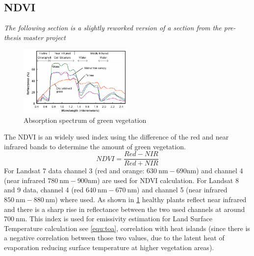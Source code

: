 \subsection{NDVI}
\textit{The following section is a slightly reworked version of a section from the pre-thesis master project~\cite{andrae2023}} 
%
\noindent
\begin{figure}[!htbp]
    \centering
    \includegraphics[width=0.5\textwidth]{img/Reflectance-spectra-of-different-types-of-green-vegetation-compared-to-a-spectral.png}
    \caption{Absorption spectrum of green vegetation\cite[Fig. 2]{Govender2007}\label{fig:absorbtionVeg}}
\end{figure}
The \gls{NDVI} is an widely used index using the difference of the red and near infrared bands to determine the amount of green vegetation. 
\begin{equation}
    NDVI = \frac{Red-NIR}{Red+NIR}
    \label{equ:ndvi}
\end{equation}
For Landsat 7 data channel 3 (red and orange: $630\ \text{nm} - 690 \text{nm}$) and channel 4 (near infrared $780\ \text{nm} - 900 \text{nm}$) are used for \gls{NDVI} calculation.  
For Landsat 8 and 9 data, channel 4 (red $640\ \text{nm} - 670\ \text{nm}$) and channel 5 (near infrared $850\ \text{nm} - 880\ \text{nm}$) where used.
As shown in \cref{fig:absorbtionVeg} healthy plants reflect near infrared and there is a sharp rise in reflectance between the two used channels at around $700\ \text{nm}$. 
%
This index is used for emissivity estimation for Land Surface Temperature calculation see \cref{equ:toa}, correlation with heat islands (since there is a negative correlation between those two values, due to the latent heat of evaporation reducing surface temperature at higher vegetation areas).
